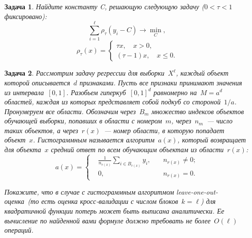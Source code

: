 \documentclass[12pt,fleqn]{article}
\newtheorem{esProblem}{Задача}
\begin{document}
\begin{esProblem}
    Найдите константу C, решающую следующую задачу ($0 < \tau < 1$ фиксировано):
    \[
    \sum_{i=1}^\ell \rho_\tau (y_i - C) \rightarrow \min_{C},
    \]
    \[
    \rho_\tau(x) = \begin{cases} \tau x, \quad x > 0, \\ (\tau - 1) x, \quad x \leqslant 0. \end{cases}
    \]
\end{esProblem}

\begin{esProblem}
    Рассмотрим задачу регрессии для выборки~$X^\ell$,
    каждый объект которой описывается~$d$ признаками.
    Пусть все признаки принимают значения из интервала~$[0, 1]$.
    Разобьем гиперкуб~$[0, 1]^d$ равномерно на~$M = a^d$ областей,
    каждая из которых представляет собой подкуб со стороной~$1/a$.
    Пронумеруем все области.
    Обозначим через~$B_m$ множество индексов объектов обучающей выборки,
    попавших в области с номером~$m$,
    через~$n_m$~--- число таких объектов,
    а через~$r(x)$~--- номер области, в которую попадает объект~$x$.
    \emph{Гистограммным} называется алгоритм~$a(x)$, который возвращает для объекта~$x$
    средний ответ по всем обучающим объектам из области~$r(x)$:
    \[
        a(x)
        =
        \left\{
            \begin{aligned}
                &\frac{1}{n_{r(x)}}
                \sum_{i \in B_{r(x)}}
                    y_i,
                \quad
                &n_{r(x)} \neq 0;\\
                &0,
                \quad
                &n_{r(x)} = 0.
            \end{aligned}
        \right.
    \]

    Покажите, что в случае с гистограммным алгоритмом
    leave-one-out-оценка~(то есть оценка кросс-валидации с числом блоков~$k=\ell$) для квадратичной функции потерь
    может быть выписана аналитически.
    Ее вычисление по найденной вами формуле должно требовать
    не более~$O(\ell)$ операций.
\end{esProblem}
\end{document}

